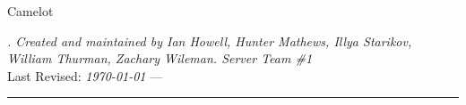\begin{titlepage}

\noindent
\titlefont Camelot \\ \titlepagename \par
\vspace{1cm}
\begin{center}
\textit{\titledescript. Created and maintained by Ian Howell, Hunter Mathews, Illya Starikov, William Thurman, Zachary Wileman. Server Team \#1}\\
\vspace{0.5cm}
Last Revised: \textit{\today} --- \lastEditAuthor
\end{center}
\null\vfill
\vspace*{1cm}
\noindent
\hfill
\begin{minipage}{0.35\linewidth}
    \begin{flushright}
    \end{flushright}
\end{minipage}
%
\begin{minipage}{0.02\linewidth}
    \rule{1pt}{125pt}
\end{minipage}
\end{titlepage}
